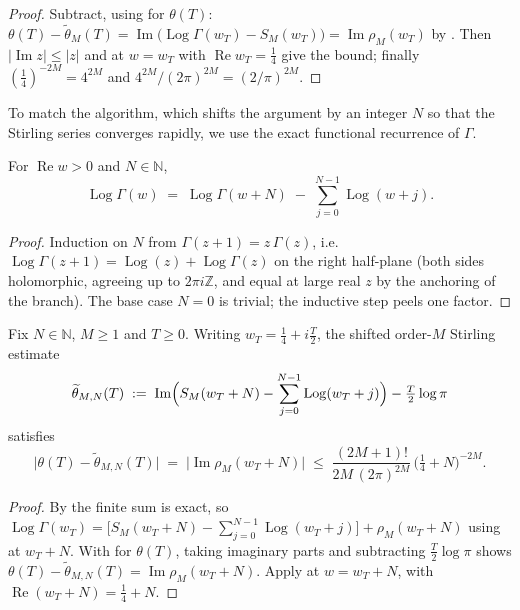 \begin{proof}
\leanok
{}
Subtract, using  for $\theta(T)$:
$\theta(T)-\widetilde\theta_M(T)=\operatorname{Im}\bigl(\operatorname{Log}\Gamma(w_T)-S_M(w_T)\bigr)
=\operatorname{Im}\rho_M(w_T)$ by . Then
$|\operatorname{Im}z|\le|z|$ and  at $w=w_T$ with
$\operatorname{Re}w_T=\tfrac14$ give the bound; finally
$(\tfrac14)^{-2M}=4^{2M}$ and $4^{2M}/(2\pi)^{2M}=(2/\pi)^{2M}$.
\end{proof}

To match the algorithm, which shifts the argument by an integer $N$ so that the
Stirling series converges rapidly, we use the exact functional recurrence of
$\Gamma$.

\begin{lemma}
\label{lem:hz_shift}
\leanok
For $\operatorname{Re}w>0$ and $N\in\mathbb{N}$,
\[
  \operatorname{Log}\Gamma(w)\;=\;\operatorname{Log}\Gamma(w+N)\;-\;\sum_{j=0}^{N-1}\operatorname{Log}(w+j).
\]
\end{lemma}

\begin{proof}
\leanok
Induction on $N$ from $\Gamma(z+1)=z\,\Gamma(z)$, i.e.
$\operatorname{Log}\Gamma(z+1)=\operatorname{Log}(z)+\operatorname{Log}\Gamma(z)$ on the
right half-plane (both sides holomorphic, agreeing up to $2\pi i\mathbb{Z}$, and equal
at large real $z$ by the anchoring of the branch). The base case $N=0$ is trivial;
the inductive step peels one factor.
\end{proof}

\begin{corollary}
\label{cor:hz_theta_shifted}
\leanok
{}
Fix $N\in\mathbb{N}$, $M\ge1$ and $T\ge0$. Writing $w_T=\tfrac14+i\tfrac T2$, the shifted
order-$M$ Stirling estimate
\[
  \widetilde\theta_{M,N}(T)\;:=\;\operatorname{Im}\Bigl(S_M(w_T+N)-\sum_{j=0}^{N-1}\operatorname{Log}(w_T+j)\Bigr)-\tfrac T2\log\pi
\]
satisfies
\[
  \bigl|\theta(T)-\widetilde\theta_{M,N}(T)\bigr|
  \;=\;\bigl|\operatorname{Im}\rho_M(w_T+N)\bigr|
  \;\le\;\frac{(2M+1)!}{2M\,(2\pi)^{2M}}\,\bigl(\tfrac14+N\bigr)^{-2M}.
\]
\end{corollary}

\begin{proof}
\leanok
{}
By  the finite sum is exact, so
$\operatorname{Log}\Gamma(w_T)=\bigl[S_M(w_T+N)-\sum_{j=0}^{N-1}\operatorname{Log}(w_T+j)\bigr]+\rho_M(w_T+N)$
using  at $w_T+N$. With  for $\theta(T)$,
taking imaginary parts and subtracting
$\tfrac T2\log\pi$ shows $\theta(T)-\widetilde\theta_{M,N}(T)=\operatorname{Im}\rho_M(w_T+N)$.
Apply  at $w=w_T+N$, with
$\operatorname{Re}(w_T+N)=\tfrac14+N$.
\end{proof}

